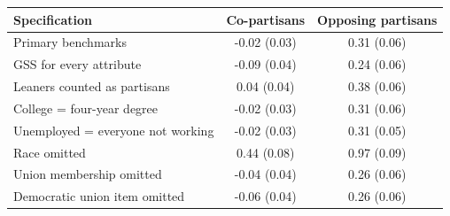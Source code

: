 \begin{tabular}{lcc}
\toprule
Specification & Co-partisans & Opposing partisans \\
\midrule
Primary benchmarks & -0.02 (0.03) & 0.31 (0.06) \\
GSS for every attribute & -0.09 (0.04) & 0.24 (0.06) \\
Leaners counted as partisans & 0.04 (0.04) & 0.38 (0.06) \\
College = four-year degree & -0.02 (0.03) & 0.31 (0.06) \\
Unemployed = everyone not working & -0.02 (0.03) & 0.31 (0.05) \\
Race omitted & 0.44 (0.08) & 0.97 (0.09) \\
Union membership omitted & -0.04 (0.04) & 0.26 (0.06) \\
Democratic union item omitted & -0.06 (0.04) & 0.26 (0.06) \\
\bottomrule
\end{tabular}
